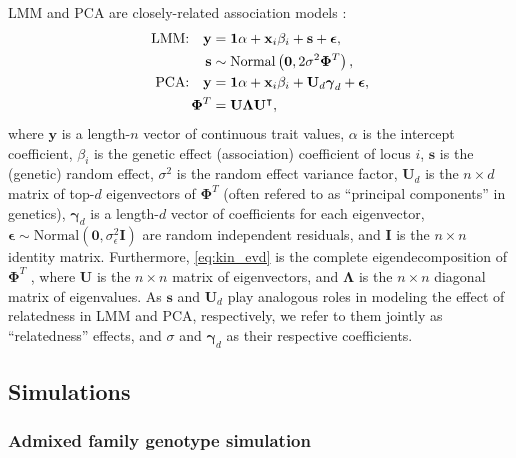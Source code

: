 \documentclass[11pt]{article}
\newcommand{\kinMat}[1][T]{%
  \ensuremath{%
    \mathbf{\Phi}^{#1}
  }%
  \xspace%
}%
\begin{document}
LMM and PCA are closely-related association models \citep{astle_population_2009, hoffman_correcting_2013, yao_limitations_2022}:
\begin{align}
  \label{eq:lmm_gwas}
  \text{LMM:}\quad
  \mathbf{y}
  &=
    \mathbf{1} \alpha + \mathbf{x}_i \beta_i + \mathbf{s} + \boldsymbol{\epsilon}
    , \\
  \label{eq:lmm_rand_eff}
  \mathbf{s}
  &\sim
    \text{Normal} \left( \mathbf{0}, 2 \sigma^2 \kinMat \right), \\
  \label{eq:pca_gwas}
  \text{PCA:}\quad
  \mathbf{y}
  &=
    \mathbf{1} \alpha + \mathbf{x}_i \beta_i + \mathbf{U}_d \boldsymbol{\gamma}_d + \boldsymbol{\epsilon}
    , \\
  \label{eq:kin_evd}
  \kinMat
  &=
    \mathbf{U} \mathbf{\Lambda} \mathbf{U}^\intercal
    ,
\end{align}
where
$\mathbf{y}$ is a length-$n$ vector of continuous trait values,
$\alpha$ is the intercept coefficient,
$\beta_i$ is the genetic effect (association) coefficient of locus $i$,
$\mathbf{s}$ is the (genetic) random effect,
$\sigma^2$ is the random effect variance factor,
$\mathbf{U}_d$ is the $n \times d$ matrix of top-$d$ eigenvectors of \kinMat (often refered to as ``principal components'' in genetics),
$\boldsymbol{\gamma}_d$ is a length-$d$ vector of coefficients for each eigenvector,
$\boldsymbol{\epsilon} \sim \text{Normal}(\mathbf{0}, \sigma^2_\epsilon \mathbf{I})$ are random independent residuals,
and $\mathbf{I}$ is the $n \times n$ identity matrix.
Furthermore, \cref{eq:kin_evd} is the complete eigendecomposition of \kinMat,
where $\mathbf{U}$ is the $n \times n$ matrix of eigenvectors, and
$\mathbf{\Lambda}$ is the $n \times n$ diagonal matrix of eigenvalues.
As $\mathbf{s}$ and $\mathbf{U}_d$ play analogous roles in modeling the effect of relatedness in LMM and PCA, respectively, we refer to them jointly as ``relatedness'' effects, and $\sigma$ and $\boldsymbol{\gamma}_d$ as their respective coefficients.

\subsection{Simulations}

\subsubsection{Admixed family genotype simulation}
\end{document}
